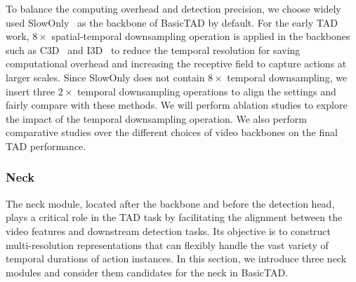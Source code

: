 \documentclass[a4paper,fleqn]{cas-dc}
\begin{document}
To balance the computing overhead and detection precision, we choose widely used SlowOnly~\citep{slowfast} as the backbone of BasicTAD by default.
For the early TAD work, $8\times$ spatial-temporal downsampling operation is applied in the backbones such as C3D~\citep{c3d} and I3D~\citep{i3d} to reduce the temporal resolution for saving computational overhead and increasing the receptive field to capture actions at larger scales. 
Since SlowOnly does not contain $8\times$ temporal downsampling, we insert three $2\times$ temporal downsampling operations to align the settings and fairly compare with these methods. We will perform ablation studies to explore the impact of the temporal downsampling operation.
We also perform comparative studies over the different choices of video backbones on the final TAD performance.

\subsubsection{Neck}
\label{sec:neck}
The neck module, located after the backbone and before the detection head, plays a critical role in the TAD task by facilitating the alignment between the video features and downstream detection tasks. 
Its objective is to construct multi-resolution representations that can flexibly handle the vast variety of temporal durations of action instances.
In this section, we introduce three neck modules and consider them candidates for the neck in BasicTAD.
\end{document}
